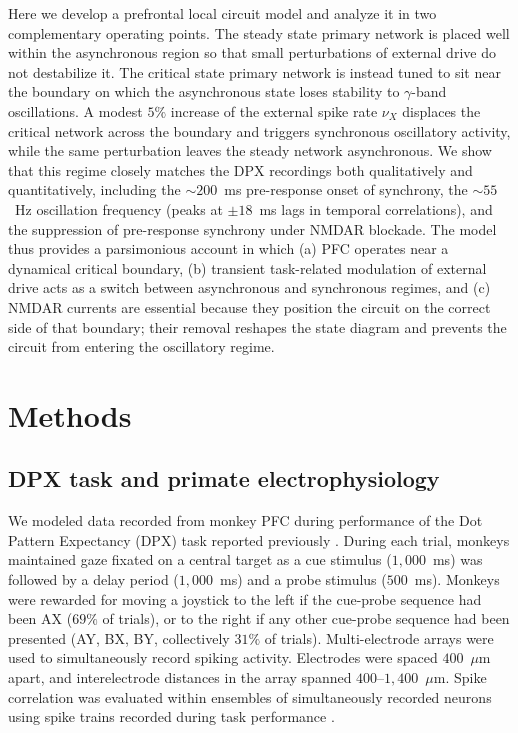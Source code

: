 \documentclass[11pt]{article}
\begin{document}
Here we develop a prefrontal local circuit model and analyze it in two complementary operating points. The steady state primary network is placed well within the asynchronous region so that small perturbations of external drive do not destabilize it. The critical state primary network is instead tuned to sit near the boundary on which the asynchronous state loses stability to $\gamma$-band oscillations. A modest $5\%$ increase of the external spike rate $\nu_X$ displaces the critical network across the boundary and triggers synchronous oscillatory activity, while the same perturbation leaves the steady network asynchronous. We show that this regime closely matches the DPX recordings both qualitatively and quantitatively, including the $\sim 200$~ms pre-response onset of synchrony, the $\sim 55$~Hz oscillation frequency (peaks at $\pm 18$~ms lags in temporal correlations), and the suppression of pre-response synchrony under NMDAR blockade. The model thus provides a parsimonious account in which (a) PFC operates near a dynamical critical boundary, (b) transient task-related modulation of external drive acts as a switch between asynchronous and synchronous regimes, and (c) NMDAR currents are essential because they position the circuit on the correct side of that boundary; their removal reshapes the state diagram and prevents the circuit from entering the oscillatory regime.

\section{Methods}

\subsection{DPX task and primate electrophysiology}

We modeled data recorded from monkey PFC during performance of the Dot Pattern Expectancy (DPX) task reported previously \citep{zick2018differential}. During each trial, monkeys maintained gaze fixated on a central target as a cue stimulus ($1{,}000$~ms) was followed by a delay period ($1{,}000$~ms) and a probe stimulus ($500$~ms). Monkeys were rewarded for moving a joystick to the left if the cue-probe sequence had been AX ($69\%$ of trials), or to the right if any other cue-probe sequence had been presented (AY, BX, BY, collectively $31\%$ of trials). Multi-electrode arrays were used to simultaneously record spiking activity. Electrodes were spaced $400$~$\mu$m apart, and interelectrode distances in the array spanned $400$--$1{,}400$~$\mu$m. Spike correlation was evaluated within ensembles of simultaneously recorded neurons using spike trains recorded during task performance \citep{zick2018differential}.
\end{document}
